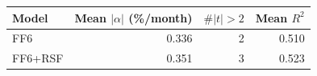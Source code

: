 \begin{tabular}{lrrr}
\toprule
Model & Mean $|\alpha|$ (\%/month) & $\#|t|>2$ & Mean $R^2$ \\
\midrule
FF6 & 0.336 & 2 & 0.510 \\
FF6+RSF & 0.351 & 3 & 0.523 \\
\bottomrule
\end{tabular}